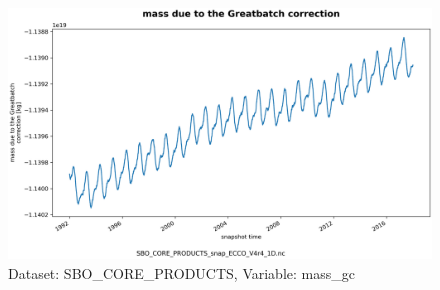 \begin{figure}[H]
\centering
\includegraphics[scale=0.55]{../images/plots/oneD_plots/SBO_Core_Products/mass_gc.png}
\caption{Dataset: SBO\_CORE\_PRODUCTS, Variable: mass\_gc}
\label{tab:table-SBO_CORE_PRODUCTS_mass_gc-Plot}
\end{figure}
\pagebreak
